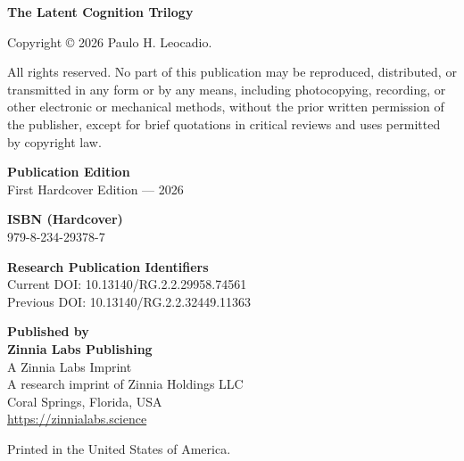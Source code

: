\thispagestyle{empty}
\begingroup
\small
\noindent\textbf{The Latent Cognition Trilogy}\par
\vspace{0.10in}
\noindent Copyright \copyright{} 2026 Paulo H. Leocadio.\par
\vspace{0.16in}
\noindent All rights reserved. No part of this publication may be reproduced,
distributed, or transmitted in any form or by any means, including
photocopying, recording, or other electronic or mechanical methods,
without the prior written permission of the publisher, except for brief
quotations in critical reviews and uses permitted by copyright law.\par
\vspace{0.18in}
\noindent\textbf{Publication Edition}\\
First Hardcover Edition --- 2026\par
\vspace{0.16in}
\noindent\textbf{ISBN (Hardcover)}\\
979-8-234-29378-7\par
\vspace{0.16in}
\noindent\textbf{Research Publication Identifiers}\\
Current DOI: 10.13140/RG.2.2.29958.74561\\
Previous DOI: 10.13140/RG.2.2.32449.11363\par
\vspace{0.16in}
\noindent\textbf{Published by}\\
{\normalsize\bfseries Zinnia Labs Publishing}\\
A Zinnia Labs Imprint\\
A research imprint of Zinnia Holdings LLC\\
Coral Springs, Florida, USA\\
\url{https://zinnialabs.science}\par
\vspace{0.16in}
\noindent Printed in the United States of America.\par
\endgroup
\clearpage


